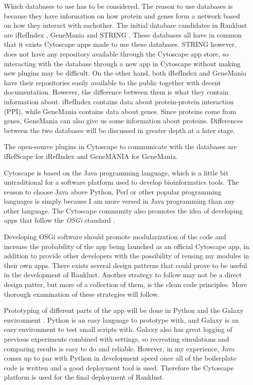 \documentclass[UKenglish,11pt,a4paper]{article}
\begin{document}
Which databases to use has to be considered. The reason to use databases is because they have information on how protein 
and genes form a network based on how they interact with eachother. The initial database candidates in Ranklust are
iRefIndex \cite{iri}, GeneMania \cite{gm} and STRING \cite{str}. These databases all have in common that it exists
Cytoscape apps made to use these databases. STRING however, does not have any repository available through the Cytoscape
app store, so interacting with the database through a new app in Cytoscape without making new plugins may be difficult.
On the other hand, both iRefIndex and GeneMania have their repositories easily available to the public together with
decent documentation. However, the difference between them is what they contain information about. iRefIndex contains
data about protein-protein interaction (PPI), while GeneMania contains data about genes.
Since proteins come from genes, GeneMania can also give us some information about proteins. Differences between the
two databases will be discussed in greater depth at a later stage.

The open-source plugins in Cytoscape to communicate with the databases are iRefScape \cite{iridb} for iRefIndex and 
GeneMANIA \cite{gmdb} for GeneMania.

Cytoscape is based on the Java programming language, which is a little bit untraditional for a software platform used to
develop bioinformatics tools. %
The reason to choose Java above Python, Perl or other popular programming languages is simply because I am more
versed in Java programming than any other language. The Cytoscape community also promotes the idea of developing apps
that follow the \emph{OSGi} standard \cite{cytoscape-osgi}.

Developing OSGi software should promote modularization %
of the code and increase the probability of the app being launched as an official Cytoscape app, in addition to provide
other developers with the possibility of reusing my modules in their own apps. There exists several design patterns that
could prove to be useful in the development of Ranklust. Another strategy to follow may not be a direct design patter,
but more of a collection of them, is the clean code principles. More thorough examination of these strategies will
follow. %

Prototyping of different parts of the app will be done in Python and the Galaxy environment \cite{galaxy}. Python is an 
easy language to prototype with, and Galaxy is an easy environment to test small scripts with. Galaxy also has great 
logging of previous experiments combined with settings, so recreating simulations and comparing results is easy to do and
reliable. However, in my experience, Java comes up to par with Python in development speed once all of the boilerplate
code is written and a good deployment tool is used. Therefore the Cytoscape platform is used for the final deployment of
Ranklust.
\end{document}
